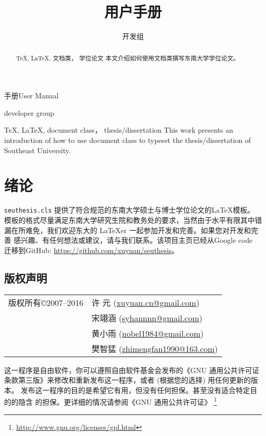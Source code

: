 ﻿\documentclass[figurelist,tablelist,algorithmlist,nomlist,masters]{seuthesis}
\begin{document}
\title{\seuthesis 用户手册}{手册}{\seuthesis User Manual}{\seuthesis}
\author{\seuthesis 开发组}{\seuthesis developer group}
\major{\TeX}
\submajor{\LaTeX}
\authorizedate{\today}
\makebigcover
\makecover
\begin{abstract}{\TeX, \LaTeX, 文档类， 学位论文}
本文介绍如何使用\seuthesis 文档类撰写东南大学学位论文。
\end{abstract}

\begin{englishabstract}{\TeX, \LaTeX, document class， thesis/dissertation}
 This work presents an introduction of how to use \seuthesis document class to typeset the thesis/dissertation of Southeast University.
\end{englishabstract}

\tableofcontents
\listofothers

\mainmatter

\chapter{绪论}
\verb+seuthesis.cls+ 提供了符合规范的东南大学硕士与博士学位论文的\LaTeX 模板。
模板的格式尽量满足东南大学研究生院和教务处的要求，当然由于水平有限其中错
漏在所难免，我们欢迎东大的 \LaTeX{er} 一起参加开发和完善。如果您对开发和完善\seuthesis
感兴趣、有任何想法或建议，请与我们联系。该项目主页已经从Google code 迁移到GitHub:
\url{https://github.com/xuyuan/seuthesis}。

\section{版权声明}

\begin{tabular}{rl}
版权所有\copyright 2007--2016 & 许 元 (\url{xuyuan.cn@gmail.com})\\
 &宋翊涵 (\url{syhannnn@gmail.com})\\
 & 黄小雨 (\url{nobel1984@gmail.com})\\
 & 樊智猛 (\url{zhimengfan1990@163.com})
\end{tabular}
\par
这一程序是自由软件，你可以遵照自由软件基金会发布的《GNU 通用公共许可证
条款第三版》来修改和重新发布这一程序，或者 (根据您的选择) 用任何更新的版本。
发布这一程序的目的是希望它有用，但没有任何担保。甚至没有适合特定目的的隐含
的担保。更详细的情况请参阅《GNU 通用公共许可证》
\footnote{\url{http://www.gnu.org/licenses/gpl.html}}
\end{document}

